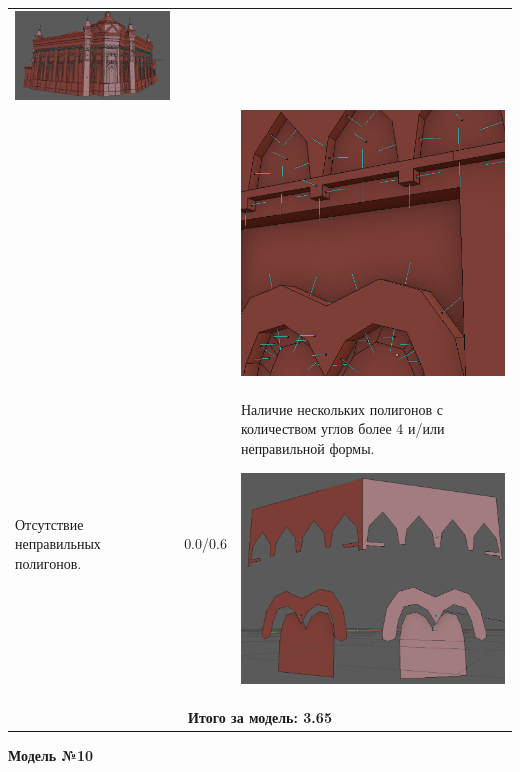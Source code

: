 \begin{longtable}{|p{4cm}|p{2.5cm}|p{7.5cm}|}
    \includegraphics[width=7cm]{src/norm_17}\\
    & & \includegraphics[width=7cm]{src/norm_18}\\
    \hline
    Отсутствие неправильных полигонов. & 0.0/0.6 & Наличие нескольких полигонов с количеством углов более 4 и/или неправильной формы.

    \includegraphics[width=7cm]{src/poly_9} \\
    \hline
    \multicolumn{3}{|c|}{\textbf{Итого за модель: 3.65}}\\
    \hline
\end{longtable}

\begin{center}
    \textbf{Модель №10}
\end{center}

